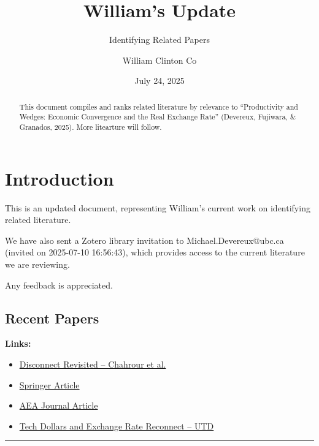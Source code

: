 \documentclass[
  11pt,
]{article}
\title{William's Update}
\subtitle{Identifying Related Papers}
\author{William Clinton Co}
\date{July 24, 2025}
\providecommand{\tightlist}{%
  \setlength{\itemsep}{0pt}\setlength{\parskip}{0pt}}
\renewcommand*\contentsname{Table of contents}
\newcommand\contentsname{Table of contents}
\begin{document}
\maketitle
\begin{abstract}
This document compiles and ranks related literature by relevance to
``Productivity and Wedges: Economic Convergence and the Real Exchange
Rate'' (Devereux, Fujiwara, \& Granados, 2025). More litearture will
follow.
\end{abstract}

\renewcommand*\contentsname{Table of contents}
{
\hypersetup{linkcolor=}
\setcounter{tocdepth}{3}
\tableofcontents
}

\section{Introduction}\label{introduction}

This is an updated document, representing William's current work on
identifying related literature.

We have also sent a Zotero library invitation to Michael.Devereux@ubc.ca
(invited on 2025-07-10 16:56:43), which provides access to the current
literature we are reviewing.

Any feedback is appreciated.

\subsection{Recent Papers}\label{recent-papers}

\textbf{Links:}

\begin{itemize}
\tightlist
\item
  \href{https://chahrour.github.io/papers/Disconnect_revisited.pdf?utm_source=chatgpt.com}{Disconnect
  Revisited -- Chahrour et al.}
\item
  \href{https://link.springer.com/article/10.1057/s41308-024-00251-0}{Springer
  Article}
\item
  \href{https://www.aeaweb.org/articles?from=f&id=10.1257\%2Fmac.20210445&utm_source=chatgpt.com}{AEA
  Journal Article}
\item
  \href{https://bpb-us-e2.wpmucdn.com/sites.utdallas.edu/dist/8/1090/files/2024/08/Tech-Dollars-and-Exchange-Rate-Reconnect.pdf?utm_source=chatgpt.com}{Tech
  Dollars and Exchange Rate Reconnect -- UTD}
\end{itemize}

\begin{center}\rule{0.5\linewidth}{0.5pt}\end{center}
\end{document}
